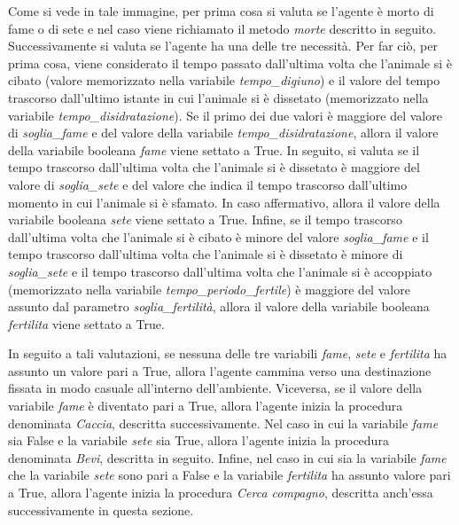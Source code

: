 \documentclass[11pt]{article}
\begin{document}
Come si vede in tale immagine, per prima cosa si valuta se l'agente è morto di fame o di sete e nel caso viene richiamato il metodo \emph{morte} descritto in seguito. Successivamente si valuta se l'agente ha una delle tre necessità. Per far ciò, per prima cosa, viene considerato il tempo passato dall'ultima volta che l'animale si è cibato (valore memorizzato nella variabile \emph{tempo\_digiuno}) e il valore del tempo trascorso dall'ultimo istante in cui l'animale si è dissetato (memorizzato nella variabile \emph{tempo\_disidratazione}). Se il primo dei due valori è maggiore del valore di \emph{soglia\_fame} e del valore della variabile \emph{tempo\_disidratazione}, allora il valore della variabile booleana \emph{fame} viene settato a True. In seguito, si valuta se il tempo trascorso dall'ultima volta che l'animale si è dissetato è maggiore del valore di \emph{soglia\_sete} e del valore che indica il tempo trascorso dall'ultimo momento in cui l'animale si è sfamato. In caso affermativo, allora il valore della variabile booleana \emph{sete} viene settato a True. Infine, se il tempo trascorso dall'ultima volta che l'animale si è cibato è minore del valore \emph{soglia\_fame} e il tempo trascorso dall'ultima volta che l'animale si è dissetato è minore di \emph{soglia\_sete} e il tempo trascorso dall'ultima volta che l'animale si è accoppiato (memorizzato nella variabile \emph{tempo\_periodo\_fertile}) è maggiore del valore assunto dal parametro \emph{soglia\_fertilità}, allora il valore della variabile booleana \emph{fertilita} viene settato a True. 

In seguito a tali valutazioni, se nessuna delle tre variabili \emph{fame}, \emph{sete} e \emph{fertilita} ha assunto un valore pari a True, allora l'agente cammina verso una destinazione fissata in modo casuale all'interno dell'ambiente. Viceversa, se il valore della variabile \emph{fame} è diventato pari a True, allora l'agente inizia la procedura denominata \emph{Caccia}, descritta successivamente. Nel caso in cui la variabile \emph{fame} sia False e la variabile \emph{sete} sia True, allora l'agente inizia la procedura denominata \emph{Bevi}, descritta in seguito. Infine, nel caso in cui sia la variabile \emph{fame} che la variabile \emph{sete} sono pari a False e la variabile \emph{fertilita} ha assunto valore pari a True, allora l'agente inizia la procedura \emph{Cerca compagno}, descritta anch'essa successivamente in questa sezione. 
\end{document}

